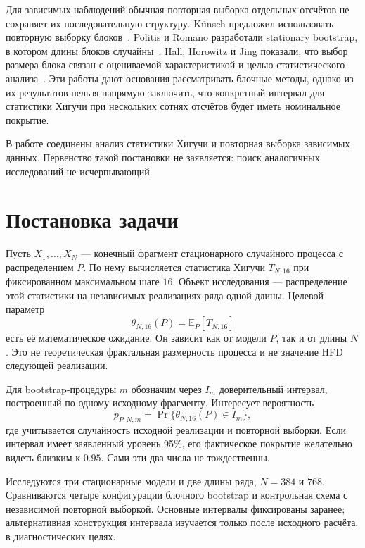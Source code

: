 Для зависимых наблюдений обычная повторная выборка отдельных отсчётов не сохраняет их последовательную структуру. Künsch предложил использовать повторную выборку блоков~\cite{kunsch1989}. Politis и Romano разработали stationary bootstrap, в котором длины блоков случайны~\cite{politis1994}. Hall, Horowitz и Jing показали, что выбор размера блока связан с оцениваемой характеристикой и целью статистического анализа~\cite{hall1995}. Эти работы дают основания рассматривать блочные методы, однако из их результатов нельзя напрямую заключить, что конкретный интервал для статистики Хигучи при нескольких сотнях отсчётов будет иметь номинальное покрытие.

В работе соединены анализ статистики Хигучи и повторная выборка зависимых данных. Первенство такой постановки не заявляется: поиск аналогичных исследований не исчерпывающий.

\section{Постановка задачи}

Пусть $X_1,\ldots,X_N$ --- конечный фрагмент стационарного случайного процесса с распределением $P$. По нему вычисляется статистика Хигучи $T_{N,16}$ при фиксированном максимальном шаге $16$. Объект исследования --- распределение этой статистики на независимых реализациях ряда одной длины. Целевой параметр
\begin{equation}\label{eq:theta}
\theta_{N,16}(P)=\mathbb{E}_P[T_{N,16}]
\end{equation}
есть её математическое ожидание. Он зависит как от модели $P$, так и от длины $N$. Это не теоретическая фрактальная размерность процесса и не значение HFD следующей реализации.

Для bootstrap-процедуры $m$ обозначим через $I_m$ доверительный интервал, построенный по одному исходному фрагменту. Интересует вероятность
\begin{equation}\label{eq:coverage_target}
 p_{P,N,m}=\Pr\{\theta_{N,16}(P)\in I_m\},
\end{equation}
где учитывается случайность исходной реализации и повторной выборки. Если интервал имеет заявленный уровень 95\%, его фактическое покрытие желательно видеть близким к $0.95$. Сами эти два числа не тождественны.

Исследуются три стационарные модели и две длины ряда, $N=384$ и $768$. Сравниваются четыре конфигурации блочного bootstrap и контрольная схема с независимой повторной выборкой. Основные интервалы фиксированы заранее; альтернативная конструкция интервала изучается только после исходного расчёта, в диагностических целях.

